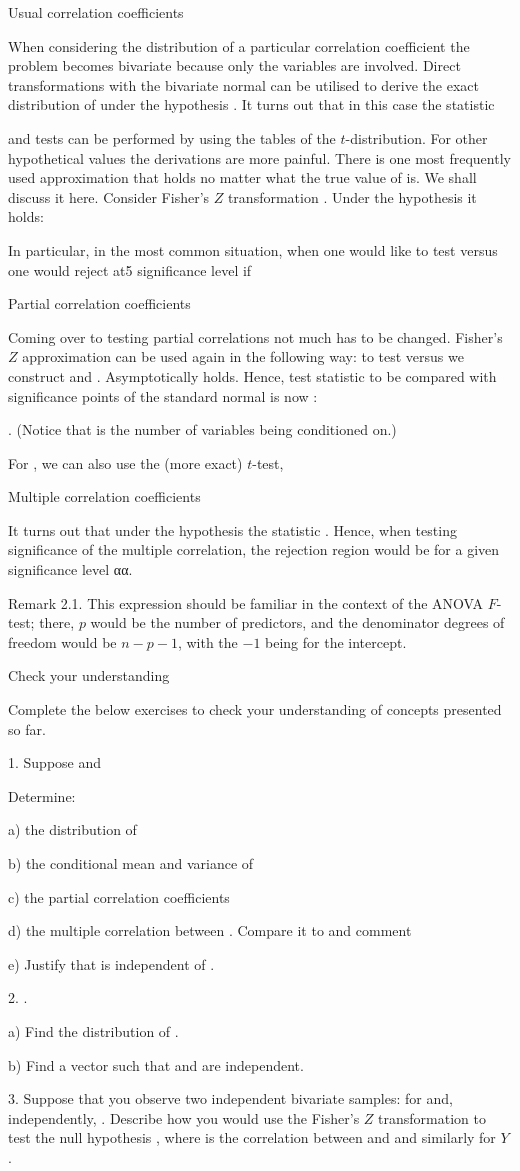 \documentclass[11pt]{article}
\begin{document}
Usual correlation coefficients

When considering the distribution of a particular correlation coefficient
 the problem becomes bivariate because only the variables  are involved.
Direct transformations with the bivariate normal can be utilised to derive the
exact distribution of under the hypothesis .
It turns out that in this case the statistic

and tests can be performed by using the tables of the $t$-distribution.
For other hypothetical values the derivations are more painful.
There is one most frequently used approximation that holds no matter what the
true value of  is.
We shall discuss it here.
Consider Fisher's $Z$ transformation .
Under the hypothesis  it holds:


In particular, in the most common situation, when one would like to test
versus  one would reject  at5  significance level if

Partial correlation coefficients

Coming over to testing partial correlations not much has to be changed.
Fisher's $Z$ approximation can be used again in the following way: to test  versus  we construct  and . Asymptotically  holds. Hence, test statistic to be compared with significance points of the standard normal is now :

. (Notice that  is the number of variables being conditioned on.)

For , we can also use the (more exact) $t$-test,

Multiple correlation coefficients

It turns out that under the hypothesis  the statistic .
Hence, when testing significance of the multiple correlation, the rejection region would be  for a given significance level αα.

Remark 2.1. This expression should be familiar in the context of the ANOVA $F$-test;
there, $p$ would be the number of predictors, and the denominator degrees of
freedom would be $n-p-1$, with the $-1$ being for the intercept.

Check your understanding

Complete the below exercises to check your understanding of concepts presented so far.

1. Suppose  and

Determine:

a) the distribution of

b) the conditional mean and variance of

c) the partial correlation coefficients

d) the multiple correlation between . Compare it to  and comment

e) Justify that  is independent of .

2. .

a) Find the distribution of .

b) Find a vector  such that   and  are independent.

3. Suppose that you observe two independent bivariate samples:  for  and, independently, .
Describe how you would use the Fisher's $Z$ transformation to test the null hypothesis , where  is the correlation between  and  and similarly for $Y$.
\end{document}
